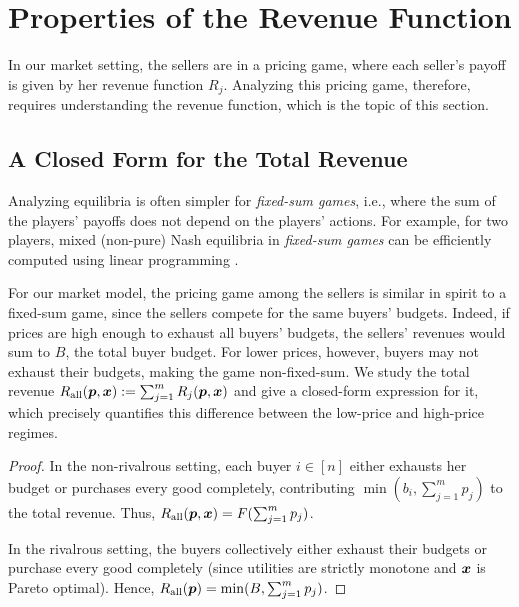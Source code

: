 \section{Properties of the Revenue Function}
\label{sec:revenue-props}

In our market setting, the sellers are in a pricing game,
where each seller's payoff is given by her revenue function $R_j$.
Analyzing this pricing game, therefore, requires understanding the revenue function, which is the topic of this section.

\subsection{A Closed Form for the Total Revenue}
\label{sec:tot-rev-closed-form}

Analyzing equilibria is often simpler for \emph{fixed-sum games},
i.e., where the sum of the players' payoffs does not depend on the players' actions.
For example, for two players, mixed (non-pure) Nash equilibria in \emph{fixed-sum games}
can be efficiently computed using linear programming \cite{dantzig1951proof}.

For our market model, the pricing game among the sellers is similar in spirit to a fixed-sum game,
since the sellers compete for the same buyers' budgets.
Indeed, if prices are high enough to exhaust all buyers' budgets,
the sellers' revenues would sum to $B$, the total buyer budget.
For lower prices, however, buyers may not exhaust their budgets,
making the game non-fixed-sum. We study the total revenue
$R_{\operatorname{all}}(\bm{p}, \bm{x}) := \sum_{j=1}^m R_j(\bm{p}, \bm{x})$
and give a closed-form expression for it,
which precisely quantifies this difference between the low-price and high-price regimes.

\begin{proof}
In the non-rivalrous setting, each buyer $i \in [n]$ either exhausts her budget
or purchases every good completely, contributing $\min(b_i, \sum_{j=1}^m p_j)$
to the total revenue. Thus, $R_{\operatorname{all}}(\bm{p}, \bm{x}) = F(\sum_{j=1}^m p_j)$.

In the rivalrous setting, the buyers collectively either exhaust their budgets
or purchase every good completely
(since utilities are strictly monotone and $\bm{x}$ is Pareto optimal).
Hence, $R_{\operatorname{all}}(\bm{p}) = \min(B, \sum_{j=1}^m p_j)$.
\end{proof}

